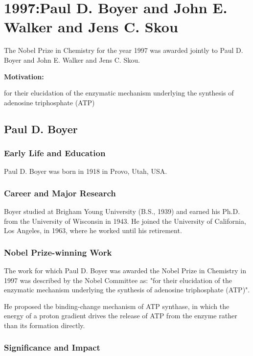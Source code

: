 \chapter{1997:Paul D. Boyer and John E. Walker and Jens C. Skou}

\label{chap:chemistry1997}

The Nobel Prize in Chemistry for the year 1997 was awarded jointly to Paul D. Boyer and John E. Walker and Jens C. Skou.

\textbf{Motivation:}

for their elucidation of the enzymatic mechanism underlying the synthesis of adenosine triphosphate (ATP)

\section{Paul D. Boyer}

\subsection*{Early Life and Education}

Paul D. Boyer was born in 1918 in Provo, Utah, USA.

\subsection*{Career and Major Research}

Boyer studied at Brigham Young University (B.S., 1939) and earned his Ph.D. from the University of Wisconsin in 1943. He joined the University of California, Los Angeles, in 1963, where he worked until his retirement.

\subsection*{Nobel Prize-winning Work}

The work for which Paul D. Boyer was awarded the Nobel Prize in Chemistry in 1997 was described by the Nobel Committee as: "for their elucidation of the enzymatic mechanism underlying the synthesis of adenosine triphosphate (ATP)".

He proposed the binding-change mechanism of ATP synthase, in which the energy of a proton gradient drives the release of ATP from the enzyme rather than its formation directly.

\subsection*{Significance and Impact}

